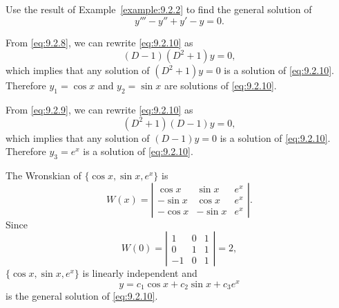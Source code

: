 \setcounter{example}{2}
\setcounter{equation}{9}
\begin{example}
  \label{example:9.2.3} \rm Use the result of Example~\ref{example:9.2.2} to find the general
  solution of
  \begin{equation}
    \label{eq:9.2.10}y'''-y''+y'-y=0.
  \end{equation}
\end{example}
\begin{examplesolution}
\solution From \eqref{eq:9.2.8}, we can rewrite \eqref{eq:9.2.10} as
\[
  (D-1)(D^{2}+1)y=0,
\]
which implies that any solution of $(D^{2}+1)y=0$ is a solution of \eqref{eq:9.2.10}. Therefore
$y_{1}=\cos x$ and $y_{2}=\sin x$ are solutions of \eqref{eq:9.2.10}.

From \eqref{eq:9.2.9}, we can rewrite \eqref{eq:9.2.10} as
\[
  (D^{2}+1)(D-1)y=0,
\]
which implies that any solution of $(D-1)y=0$ is a solution of \eqref{eq:9.2.10}. Therefore
$y_{3}=e^{x}$ is a solution of \eqref{eq:9.2.10}.

The Wronskian of $\{\cos x,\sin x,e^{x}\}$ is
\[
  W(x)=\left|
  \begin{array}{rrr}
    \cos x  & \sin x  & e^{x} \\
    -\sin x & \cos x  & e^{x} \\
    -\cos x & -\sin x & e^{x}
  \end{array}\right|.
\]
Since
\[
  W(0)=\left|
  \begin{array}{rrr}
    1  & 0 & 1 \\
    0  & 1 & 1 \\
    -1 & 0 & 1
  \end{array}\right|=2,
\]
$\{\cos x,\sin x,e^{x}\}$ is linearly independent and
\[
  y=c_{1}\cos x+c_{2}\sin x+c_{3}e^{x}
\]
is the general solution of \eqref{eq:9.2.10}.
\end{examplesolution}

